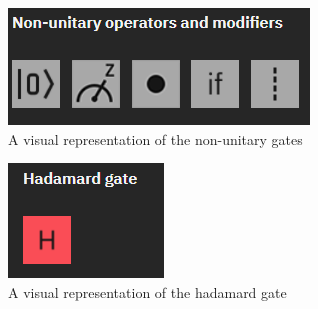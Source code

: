 \begin{figure} [h]
    \centering
    \includegraphics[width=\textwidth]{img/non-unitary-gates.PNG}
        \caption{A visual representation of the non-unitary gates}
        \label{fig:non-uni gates}
\end{figure}

\begin{figure} [h]
    \centering
    \includegraphics[width=\textwidth]{img/hadamard-gate.PNG}
        \caption{A visual representation of the hadamard gate}
        \label{fig:hadamard gates}
\end{figure}

